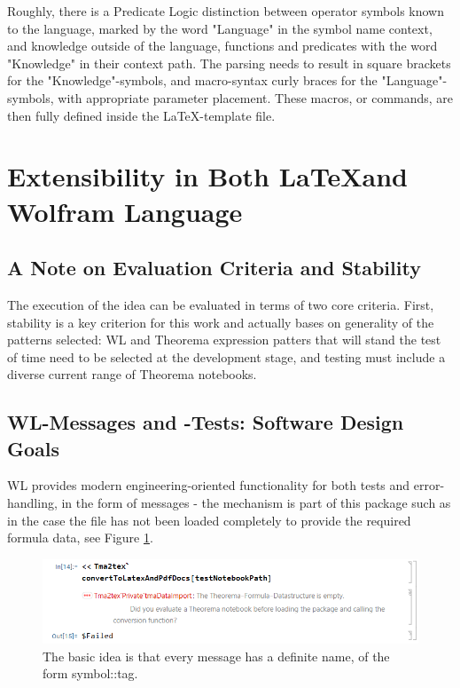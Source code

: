 Roughly, there is a Predicate Logic distinction between operator symbols known to the language, marked by the word "Language" in the symbol name context, and knowledge outside of the language, functions and predicates with the word "Knowledge" in their context path. \cite{wolfram_research_inc_contextwolfram_2024} The parsing needs to result in square brackets for the "Knowledge"-symbols, and macro-syntax curly braces for the "Language"-symbols, with appropriate parameter placement. These macros, or commands, are then fully defined inside the \LaTeX-template file.

\section{Extensibility in Both \LaTeX and Wolfram Language}

\subsection{A Note on Evaluation Criteria and Stability}

The execution of the idea can be evaluated in terms of two core criteria. First, stability is a key criterion for this work and actually bases on generality of the patterns selected: WL and Theorema expression patters that will stand the test of time need to be selected at the development stage, and testing must include a diverse current range of Theorema notebooks. 

\subsection{WL-Messages and -Tests: Software Design Goals}

WL provides modern engineering-oriented functionality for both tests and error-handling, in the form of messages \cite{wolfram_research_inc_messagewolfram_2024} - the mechanism is part of this package such as in the case the file has not been loaded completely to provide the required formula data, see Figure \ref{fig:message-demo}.

\begin{figure}[h]
    \centering
    \includegraphics[scale=.8]{images/concept/Tma2Tex-Message-Demo.png}
    \caption{The basic idea is that every message has a definite name, of the form symbol::tag. \cite{wolfram_research_inc_textual_2024}}
    \label{fig:message-demo}
\end{figure}

